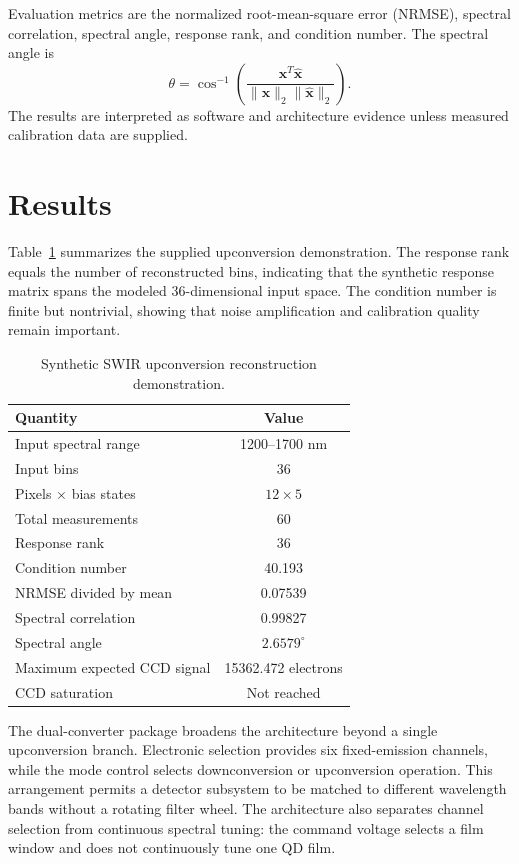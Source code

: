 \documentclass[conference]{IEEEtran}
\begin{document}
Evaluation metrics are the normalized root-mean-square error (NRMSE), spectral correlation, spectral angle, response rank, and condition number. The spectral angle is
\begin{equation}
 \theta=\cos^{-1}\left(\frac{\mathbf{x}^{T}\widehat{\mathbf{x}}}{\|\mathbf{x}\|_2\|\widehat{\mathbf{x}}\|_2}\right).
\end{equation}
The results are interpreted as software and architecture evidence unless measured calibration data are supplied.

\section{Results}
Table~\ref{tab:results} summarizes the supplied upconversion demonstration. The response rank equals the number of reconstructed bins, indicating that the synthetic response matrix spans the modeled 36-dimensional input space. The condition number is finite but nontrivial, showing that noise amplification and calibration quality remain important.

\begin{table}[t]
\caption{Synthetic SWIR upconversion reconstruction demonstration.}
\label{tab:results}
\centering
\begin{tabular}{lc}
\toprule
Quantity & Value\\
\midrule
Input spectral range & 1200--1700 nm\\
Input bins & 36\\
Pixels $\times$ bias states & $12\times5$\\
Total measurements & 60\\
Response rank & 36\\
Condition number & 40.193\\
NRMSE divided by mean & 0.07539\\
Spectral correlation & 0.99827\\
Spectral angle & $2.6579^{\circ}$\\
Maximum expected CCD signal & 15362.472 electrons\\
CCD saturation & Not reached\\
\bottomrule
\end{tabular}
\end{table}

The dual-converter package broadens the architecture beyond a single upconversion branch. Electronic selection provides six fixed-emission channels, while the mode control selects downconversion or upconversion operation. This arrangement permits a detector subsystem to be matched to different wavelength bands without a rotating filter wheel. The architecture also separates channel selection from continuous spectral tuning: the command voltage selects a film window and does not continuously tune one QD film.
\end{document}
